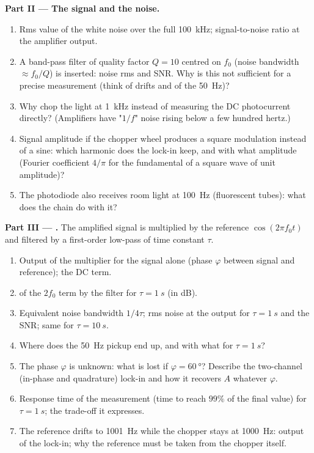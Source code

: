 \begin{problem}
\medskip
\noindent\textbf{Part II --- The signal and the noise.}
\begin{enumerate}[resume]
  \item Rms value of the white noise over the full \qty{100}{kHz};
        signal-to-noise ratio at the amplifier output.
  \item A band-pass filter of quality factor $Q = 10$ centred on $f_0$
        (noise bandwidth $\approx f_0/Q$) is inserted: noise rms and SNR.
        Why is this not sufficient for a precise measurement (think of
        drifts and of the \qty{50}{Hz})?
  \item Why chop the light at \qty{1}{kHz} instead of measuring the DC
        photocurrent directly? (Amplifiers have "$1/f$" noise rising
        below a few hundred hertz.)
  \item Signal amplitude if the chopper wheel produces a square
        modulation instead of a sine: which harmonic does the lock-in
        keep, and with what amplitude (Fourier coefficient $4/\pi$ for the
        fundamental of a square wave of unit amplitude)?
  \item The photodiode also receives room light at \qty{100}{Hz}
        (fluorescent tubes): what does the chain do with it?
\end{enumerate}

\medskip
\noindent\textbf{Part III --- .}
The amplified signal is multiplied by the reference $\cos(2\pi f_0t)$
and filtered by a first-order low-pass of time constant $\tau$.
\begin{enumerate}[resume]
  \item Output of the multiplier for the signal alone (phase $\varphi$
        between signal and reference); the DC term.
  \item {} of the $2f_0$ term by the filter for $\tau = \qty{1}{s}$
        (in dB).
  \item Equivalent noise bandwidth $1/4\tau$; rms noise at the output
        for $\tau = \qty{1}{s}$ and the SNR; same for $\tau = \qty{10}{s}$.
  \item Where does the \qty{50}{Hz} pickup end up, and with what
         for $\tau = \qty{1}{s}$?
  \item The phase $\varphi$ is unknown: what is lost if $\varphi = \qty{60}{\degree}$?
        Describe the two-channel (in-phase and quadrature) lock-in and
        how it recovers $A$ whatever $\varphi$.
  \item Response time of the measurement (time to reach $99\%$ of the
        final value) for $\tau = \qty{1}{s}$; the trade-off it expresses.
  \item The reference drifts to \qty{1001}{Hz} while the chopper stays at
        \qty{1000}{Hz}: output of the lock-in; why the reference must be
        taken from the chopper itself.
\end{enumerate}


\end{problem}
